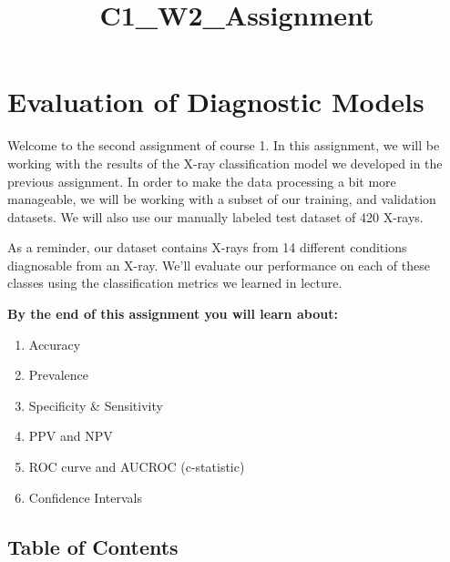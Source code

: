 \documentclass[11pt]{article}
\title{C1\_W2\_Assignment}
\providecommand{\tightlist}{%
      \setlength{\itemsep}{0pt}\setlength{\parskip}{0pt}}
\begin{document}
    
    
    \maketitle
    
    

    
    \hypertarget{evaluation-of-diagnostic-models}{%
\section{Evaluation of Diagnostic
Models}\label{evaluation-of-diagnostic-models}}

Welcome to the second assignment of course 1. In this assignment, we
will be working with the results of the X-ray classification model we
developed in the previous assignment. In order to make the data
processing a bit more manageable, we will be working with a subset of
our training, and validation datasets. We will also use our manually
labeled test dataset of 420 X-rays.

As a reminder, our dataset contains X-rays from 14 different conditions
diagnosable from an X-ray. We'll evaluate our performance on each of
these classes using the classification metrics we learned in lecture.

\textbf{By the end of this assignment you will learn about:}

\begin{enumerate}
\def\labelenumi{\arabic{enumi}.}
\tightlist
\item
  Accuracy
\item
  Prevalence
\item
  Specificity \& Sensitivity
\item
  PPV and NPV
\item
  ROC curve and AUCROC (c-statistic)
\item
  Confidence Intervals
\end{enumerate}

    \hypertarget{table-of-contents}{%
\subsection{Table of Contents}\label{table-of-contents}}
\end{document}
